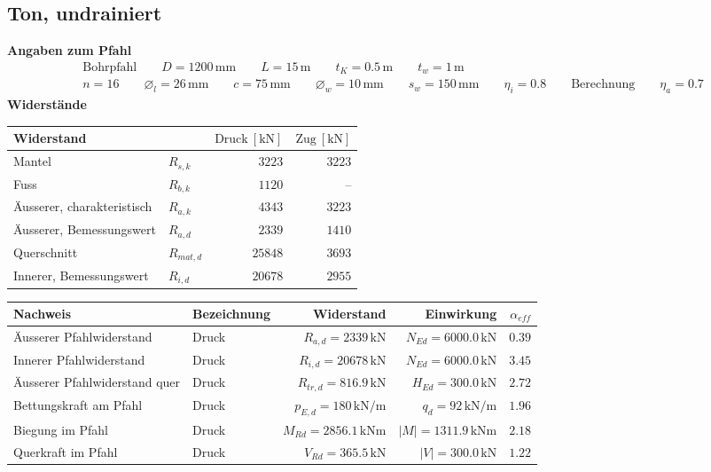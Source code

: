 \documentclass[11pt,a4paper]{article}
\begin{document}
\subsection{Ton, undrainiert}
\noindent\textbf{Angaben zum Pfahl}
\begin{equation*}
\begin{aligned} & \text{Bohrpfahl} \qquad D = 1200\,\mathrm{mm} \qquad L = 15\,\mathrm{m} \qquad t_K = 0.5\,\mathrm{m} \qquad t_w = 1\,\mathrm{m} \\ & n = 16 \qquad \varnothing_l = 26\,\mathrm{mm} \qquad c = 75\,\mathrm{mm} \qquad \varnothing_w = 10\,\mathrm{mm} \qquad s_w = 150\,\mathrm{mm} \qquad \eta_i = 0.8 \qquad \text{Berechnung} \qquad \eta_a = 0.7 \end{aligned}
\end{equation*}
\noindent\textbf{Widerstände}
\begin{longtable}{llrr}
\hline
Widerstand &  & $\text{Druck}\ [\mathrm{kN}]$ & $\text{Zug}\ [\mathrm{kN}]$ \\
\hline
\endhead
Mantel & $R_{s,k}$ & $3223$ & $3223$ \\
Fuss & $R_{b,k}$ & $1120$ & – \\
Äusserer, charakteristisch & $R_{a,k}$ & $4343$ & $3223$ \\
Äusserer, Bemessungswert & $R_{a,d}$ & $2339$ & $1410$ \\
Querschnitt & $R_{mat,d}$ & $25848$ & $3693$ \\
Innerer, Bemessungswert & $R_{i,d}$ & $20678$ & $2955$ \\
\hline
\end{longtable}
\begin{xltabular}{\linewidth}{>{\raggedright\arraybackslash}X>{\raggedright\arraybackslash}Xrrr}
\hline
Nachweis & Bezeichnung & Widerstand & Einwirkung & $\alpha_{eff}$ \\
\hline
\endhead
Äusserer Pfahlwiderstand & Druck & $R_{a,d} = 2339\,\mathrm{kN}$ & $N_{Ed} = 6000.0\,\mathrm{kN}$ & $0.39$ \\
Innerer Pfahlwiderstand & Druck & $R_{i,d} = 20678\,\mathrm{kN}$ & $N_{Ed} = 6000.0\,\mathrm{kN}$ & $3.45$ \\
Äusserer Pfahlwiderstand quer & Druck & $R_{tr,d} = 816.9\,\mathrm{kN}$ & $H_{Ed} = 300.0\,\mathrm{kN}$ & $2.72$ \\
Bettungskraft am Pfahl & Druck & $p_{E,d} = 180\,\mathrm{kN}/\mathrm{m}$ & $q_d = 92\,\mathrm{kN}/\mathrm{m}$ & $1.96$ \\
Biegung im Pfahl & Druck & $M_{Rd} = 2856.1\,\mathrm{kNm}$ & $\left|M\right| = 1311.9\,\mathrm{kNm}$ & $2.18$ \\
Querkraft im Pfahl & Druck & $V_{Rd} = 365.5\,\mathrm{kN}$ & $\left|V\right| = 300.0\,\mathrm{kN}$ & $1.22$ \\
\hline
\end{xltabular}
\end{document}
